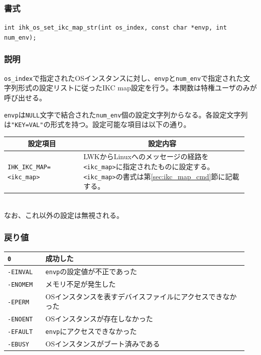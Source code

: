 \documentclass[twoside,11pt,fleqn]{book}
\begin{document}
\subsubsection*{書式}{\quad} \verb:int ihk_os_set_ikc_map_str(int os_index, const char *envp, int num_env);:
\subsubsection*{説明}{\quad} \verb:os_index:で指定されたOSインスタンスに対し、\verb:envp:と\verb:num_env:で指定された文字列形式の設定リストに従ったIKC map設定を行う。本関数は特権ユーザのみが呼び出せる。

\verb:envp:は\verb:NULL:文字で結合された\verb:num_env:個の設定文字列からなる。各設定文字列は\verb:"KEY=VAL":の形式を持つ。設定可能な項目は以下の通り。
\begin{table}[!h]
\footnotesize
\begin{tabular}{|p{0.30\linewidth}|p{0.65\linewidth}|} \hline
\multicolumn{1}{|c}{\textbf{設定項目}}&\multicolumn{1}{|c|}{\textbf{設定内容}}\\ \hline \hline
\verb:IHK_IKC_MAP=<ikc_map>:&LWKからLinuxへのメッセージの経路を\verb:<ikc_map>:に指定されたものに設定する。\verb:<ikc_map>:の書式は第\ref{sec:ikc_map_cmd}節に記載する。\\ \hline
\end{tabular}
\vspace{-0em}
\end{table}
\\なお、これ以外の設定は無視される。
\FloatBarrier

\subsubsection*{戻り値}
\begin{table}[!h]
\footnotesize
\begin{tabular}{|p{0.15\linewidth}|p{0.80\linewidth}|} \hline
\verb:0:&	成功した\\ \hline
\verb:-EINVAL:&	\verb:envp:の設定値が不正であった\\ \hline
\verb:-ENOMEM:&	メモリ不足が発生した\\ \hline
\verb:-EPERM:&	OSインスタンスを表すデバイスファイルにアクセスできなかった\\ \hline
\verb:-ENOENT:&	OSインスタンスが存在しなかった\\ \hline
\verb:-EFAULT:&	\texttt{envp}にアクセスできなかった\\ \hline
\verb:-EBUSY:&OSインスタンスがブート済みである\\ \hline
\end{tabular}
\vspace{-0em}
\end{table}
\FloatBarrier
\end{document}
